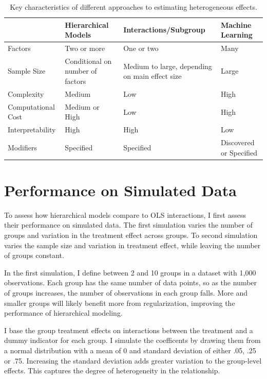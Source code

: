 \documentclass[12pt]{article}
\begin{document}
\begin{table}
\begin{tabular}{|p{1in}|p{1.5in}|p{1.5in}|p{1.5in}|} \hline
                 & Hierarchical Models & Interactions/Subgroup & Machine Learning \\
\hline
Factors              & Two or more          & One or two         & Many \\ \hline
Sample Size          & Conditional on number of factors            & Medium to large, depending on main effect size    & Large \\ \hline
Complexity           & Medium             & Low                & High \\ \hline
Computational Cost   & Medium or High             & Low                & High \\ \hline
Interpretability     & High               & High               & Low \\ \hline
Modifiers            & Specified          & Specified      & Discovered or Specified \\
\hline
\end{tabular}
\caption{Key characteristics of different approaches to estimating heterogeneous effects.}
\label{tab:tools-det}
\end{table}


\section{Performance on Simulated Data}

To assess how hierarchical models compare to OLS interactions, I first assess their performance on simulated data. 
The first simulation varies the number of groups and variation in the treatment effect across groups. 
To second simulation varies the sample size and variation in treatment effect, while leaving the number of groups constant.


In the first simulation, I define between 2 and 10 groups in a dataset with 1,000 observations.
Each group has the same number of data points, so as the number of groups increases, the number of observations in each group falls. 
More and smaller groups will likely benefit more from regularization, improving the performance of hierarchical modeling.


I base the group treatment effects on interactions between the treatment and a dummy indicator for each group. 
I simulate the coefficents by drawing them from a normal distribution with a mean of 0 and standard deviation of either .05, .25 or .75. 
Increasing the standard deviation adds greater variation to the group-level effects.
This captures the degree of heterogeneity in the relationship.
\end{document}
